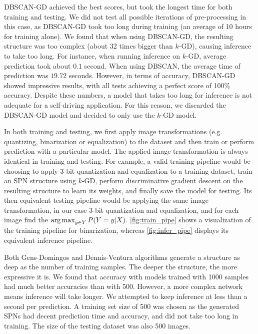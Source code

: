 DBSCAN-GD achieved the best scores, but took the longest time for both training and testing. We did
not test all possible iterations of pre-processing in this case, as DBSCAN-GD took too long during
training (an average of 10 hours for training alone). We found that when using DBSCAN-GD, the
resulting structure was too complex (about 32 times bigger than $k$-GD), causing inference to take
too long. For instance, when running inference on $k$-GD, average prediction took about $0.1$
second.  When using DBSCAN, the average time of prediction was $19.72$ seconds. However, in terms
of accuracy, DBSCAN-GD showed impressive results, with all tests achieving a perfect score of 100\%
accuracy. Despite these numbers, a model that takes too long for inference is not adequate for a
self-driving application. For this reason, we discarded the DBSCAN-GD model and decided to only use
the $k$-GD model.

In both training and testing, we first apply image transformations (e.g. quantizing, binarization
or equalization) to the dataset and then train or perform prediction with a particular model. The
applied image transformation is always identical in training and testing. For example, a valid
training pipeline would be choosing to apply 3-bit quantization and equalization to a training
dataset, train an SPN structure using $k$-GD, perform discriminative gradient descent on the
resulting structure to learn its weights, and finally save the model for testing. Its then
equivalent testing pipeline would be applying the same image transformation, in our case 3-bit
quantization and equalization, and for each image find the $\operatorname*{arg\,max}_{y\in Y} P(Y=y|X)$.
\autoref{fig:train_pipe} shows a visualization of the training pipeline for binarization, whereas
\autoref{fig:infer_pipe} displays its equivalent inference pipeline.

Both Gens-Domingos and Dennis-Ventura algorithms generate a structure as deep as the number of
training samples. The deeper the structure, the more expressive it is. We found that accuracy with
models trained with 1000 samples had much better accuracies than with 500. However, a more complex
network means inference will take longer. We attempted to keep inference at less than a second per
prediction. A training set size of 500 was chosen as the generated SPNs had decent prediction time
and accuracy, and did not take too long in training. The size of the testing dataset was also 500
images.

